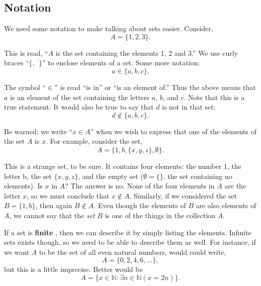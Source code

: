 \documentclass[10pt,]{book}
\newcommand{\terminology}[1]{\textbf{#1}}
\theoremstyle{plain}
\theoremstyle{definition}
\theoremstyle{definition}
\theoremstyle{definition}
\numberwithin{equation}{section}
\def\N{\mathbb N}
\def\st{:}
\begin{document}
\subsection[Notation]{Notation}\label{subsec_notation}

      We need some notation to make talking about sets easier. Consider,
      \begin{equation*}
        A = \{1, 2, 3\}.
      \end{equation*}
\par

      This is read, ``\(A\) is the set containing the elements 1, 2 and 3.'' We use curly braces ``\(\{,~~ \}\)'' to enclose elements of a set. Some more notation:
      \begin{equation*}
        a \in \{a, b, c\}.
      \end{equation*}
\par

      The symbol ``\(\in\)'' is read ``is in'' or ``is an element of.'' Thus the above means that \(a\) is an element of the set containing the letters \(a\), \(b\), and \(c\). Note that this is a true statement. It would also
      be true to say that \(d\) is not in that set:
      \begin{equation*}
        d \not\in \{a, b, c\}.
      \end{equation*}
\par

      Be warned: we write ``\(x \in A\)'' when we wish to express that one of the elements of the set \(A\) is \(x\). For example, consider the set,
      \begin{equation*}
        A = \{1, b, \{x, y, z\}, \emptyset\}.
      \end{equation*}
\par

      This is a strange set, to be sure. It contains four elements: the number 1, the letter b, the set \(\{x,y,z\}\), and the empty set (\(\emptyset = \{ \}\), the set containing no elements). Is \(x\) in \(A\)? The answer is no. None of
      the four elements in \(A\) are the letter \(x\), so we must conclude that \(x \notin A\). Similarly, if we considered the set \(B = \{1,b\}\), then again \(B \notin A\). Even though the elements of \(B\) are also elements of \(A\),
      we cannot say that the \emph{set} \(B\) is one of the things in the collection \(A\).
\par

      If a set is
      \terminology{finite}
      , then we can describe it by simply listing the elements. Infinite sets exists though, so we need to be able to describe them as well. For instance, if we want \(A\) to be the set of all even natural numbers,
      would could write,
      \begin{equation*}
        A = \{0, 2, 4, 6, \ldots\},
      \end{equation*}
      but this is a little imprecise. Better would be
      \begin{equation*}
        A = \{x \in \N \st \exists n\in \N ( x = 2 n)\}.
      \end{equation*}
\par
\end{document}
